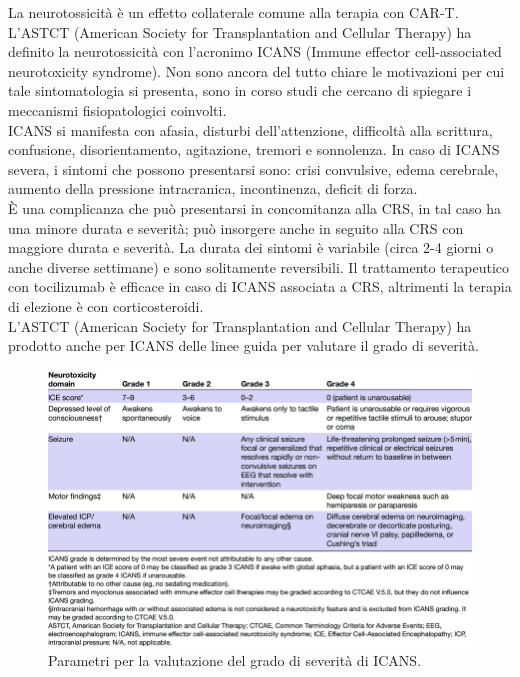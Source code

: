 La neurotossicità è un effetto collaterale comune alla terapia con CAR-T. 
L’ASTCT (American Society for Transplantation and Cellular Therapy) ha definito la neurotossicità con 
l’acronimo ICANS (Immune effector cell-associated neurotoxicity syndrome). Non sono ancora del tutto chiare le 
motivazioni per cui tale sintomatologia si presenta, sono in corso studi che cercano di spiegare i meccanismi 
fisiopatologici coinvolti\cite{EMATOCART}.\\
ICANS si manifesta con afasia, disturbi dell’attenzione, difficoltà alla scrittura, confusione, disorientamento, 
agitazione, tremori e sonnolenza. In caso di ICANS severa, i sintomi che possono presentarsi sono: crisi convulsive, 
edema cerebrale, aumento della pressione intracranica, incontinenza, deficit di forza\cite{EMATOCART}.\\
È una complicanza che può presentarsi in concomitanza alla CRS, in tal caso ha una minore durata e severità; 
può insorgere anche in seguito alla CRS con maggiore durata e severità. La durata dei sintomi è variabile 
(circa 2-4 giorni o anche diverse settimane) e sono solitamente reversibili. 
Il trattamento terapeutico con tocilizumab è efficace in caso di ICANS associata a CRS, altrimenti la terapia di 
elezione è con corticosteroidi\cite{EMATOCART}.\\
L’ASTCT (American Society for Transplantation and Cellular Therapy) 
ha prodotto anche per ICANS delle linee guida per valutare il grado di severità\cite{LEE2019625}.

\begin{figure}[H]
    \begin{center}
    \includegraphics[width=0.8\columnwidth]{img/ICANS.png}
    \end{center}
    \caption{Parametri per la valutazione del grado di severità di ICANS.
    \cite{ICANS}}

\end{figure}

